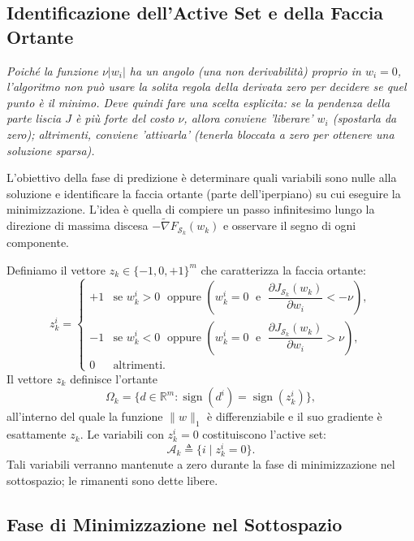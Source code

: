 \documentclass[italian, a4paper, twoside, binding=6mm]{sapthesis}
\begin{document}
\subsection{Identificazione dell'Active Set e della Faccia Ortante}
\textit{Poiché la funzione \(\nu|w_i|\) ha un angolo (una non derivabilità) proprio in \(w_i = 0\), l'algoritmo non può usare la solita regola della derivata zero per decidere se quel punto è il minimo. Deve quindi fare una scelta esplicita: se la pendenza della parte liscia \(J\) è più forte del costo \(\nu\), allora conviene 'liberare' \(w_i\) (spostarla da zero); altrimenti, conviene 'attivarla' (tenerla bloccata a zero per ottenere una soluzione sparsa).}

L'obiettivo della fase di predizione è determinare quali variabili sono nulle
alla soluzione e identificare la faccia ortante (parte dell'iperpiano) su cui eseguire la
minimizzazione. L'idea è quella di compiere un passo infinitesimo lungo la
direzione di massima discesa $-\widetilde{\nabla}F_{\mathcal{S}_k}(w_k)$ e
osservare il segno di ogni componente.

Definiamo il vettore $z_k \in \{-1,0,+1\}^m$ che caratterizza la faccia ortante:
\begin{equation}
z_k^i =
\begin{cases}
+1 & \text{se } w_k^i > 0 \;\text{ oppure } \left( w_k^i = 0 \;\text{ e }\; \dfrac{\partial J_{\mathcal{S}_k}(w_k)}{\partial w_i} < -\nu \right), \\[12pt]
-1 & \text{se } w_k^i < 0 \;\text{ oppure } \left( w_k^i = 0 \;\text{ e }\; \dfrac{\partial J_{\mathcal{S}_k}(w_k)}{\partial w_i} > \nu \right), \\[12pt]
0 & \text{altrimenti}.
\end{cases} \tag{5.44}
\end{equation}
Il vettore $z_k$ definisce l'ortante
\[
\Omega_k = \{ d \in \mathbb{R}^m : \operatorname{sign}(d^i) = \operatorname{sign}(z_k^i) \}, \tag{5.45}
\]
all'interno del quale la funzione $\|w\|_1$ è differenziabile e il suo gradiente
è esattamente $z_k$. Le variabili con $z_k^i = 0$ costituiscono l'active
set:
\begin{equation}
\mathcal{A}_k \triangleq \{ i \mid z_k^i = 0 \}. \tag{5.46}
\end{equation}
Tali variabili verranno mantenute a zero durante la fase di minimizzazione nel
sottospazio; le rimanenti sono dette libere.


\subsection{Fase di Minimizzazione nel Sottospazio}
\end{document}
